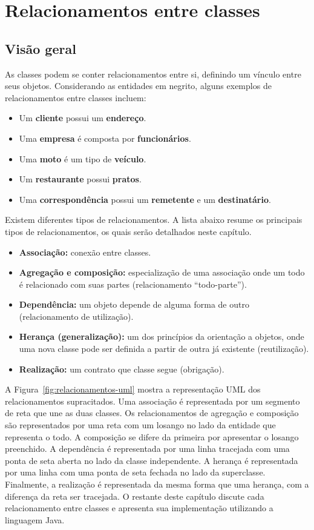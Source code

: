 \chapter{Relacionamentos entre classes }

\section{Visão geral}

As classes podem se conter relacionamentos entre si, definindo um vínculo entre seus objetos. Considerando as entidades em negrito, alguns exemplos de relacionamentos entre classes incluem:

\begin{itemize}
	\item Um \textbf{cliente} possui um \textbf{endereço}.
	\item Uma \textbf{empresa} é composta por \textbf{funcionários}.
	\item Uma \textbf{moto} é um tipo de \textbf{veículo}.
	\item Um \textbf{restaurante} possui \textbf{pratos}.
	\item Uma \textbf{correspondência} possui um \textbf{remetente} e um \textbf{destinatário}.
\end{itemize}

Existem diferentes tipos de relacionamentos. A lista abaixo resume os principais tipos de relacionamentos, os quais serão detalhados neste capítulo.

\begin{itemize}
	\item \textbf{Associação:} conexão entre classes.
	\item \textbf{Agregação e composição:} especialização de uma associação onde um todo é relacionado com suas partes (relacionamento ``todo-parte'').
	\item \textbf{Dependência:} um objeto depende de alguma forma de outro (relacionamento de utilização).
	\item \textbf{Herança (generalização):} um dos princípios da orientação a objetos, onde uma nova classe pode ser definida a partir de outra já existente (reutilização).
	\item \textbf{Realização:} um contrato que classe segue (obrigação).
\end{itemize}

A Figura~\ref{fig:relacionamentos-uml} mostra a representação UML dos relacionamentos supracitados. Uma associação é representada por um segmento de reta que une as duas classes. Os relacionamentos de agregação e composição são representados por uma reta com um losango no lado da entidade que representa o todo. A composição se difere da primeira por apresentar o losango preenchido. A dependência é representada por uma linha tracejada com uma ponta de seta aberta no lado da classe independente. A herança é representada por uma linha com uma ponta de seta fechada no lado da superclasse. Finalmente, a realização é representada da mesma forma que uma herança, com a diferença da reta ser tracejada. O restante deste capítulo discute cada relacionamento entre classes e apresenta sua implementação utilizando a linguagem Java.

